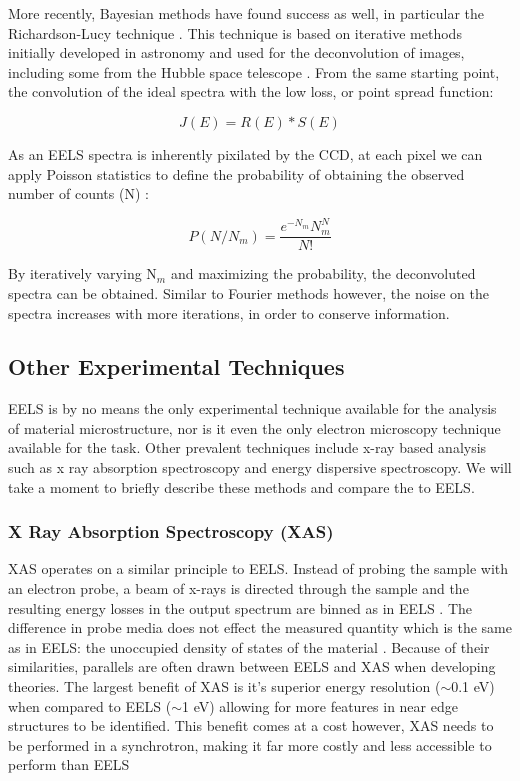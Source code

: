 More recently, Bayesian methods have found success as well, in particular the Richardson-Lucy technique \cite{richardson_lucy}. This technique is based on iterative methods initially developed in astronomy and used for the deconvolution of images, including some from the Hubble space telescope \cite{hubble}.  From the same starting point, the convolution of the ideal spectra with the low loss, or point spread function:

\begin{equation}
J(E) = R(E)\ast S(E)
\end{equation}

As an EELS spectra is inherently pixilated by the CCD, at each pixel we can apply Poisson statistics to define the probability of obtaining the observed number of counts (N) \cite{richardson_lucy}:  

\begin{equation}
	P (N/N_m) = \frac{e^{-N_m}N^N_m}{N!}
\end{equation}

By iteratively varying N$_m$ and maximizing the probability, the deconvoluted spectra can be obtained.  Similar to Fourier methods however, the noise on the spectra increases with more iterations, in order to conserve information.   


\subsection{Other Experimental Techniques}
EELS is by no means the only experimental technique available for the analysis of material microstructure, nor is it even the only electron microscopy technique available for the task. Other prevalent techniques include x-ray based analysis such as x ray absorption spectroscopy and energy dispersive spectroscopy.  We will take a moment to briefly describe these methods and compare the to EELS.

\subsubsection{X Ray Absorption Spectroscopy (XAS)}
XAS operates on a similar principle to EELS.  Instead of probing the sample with an electron probe, a beam of x-rays is directed through the sample and the resulting energy losses in the output spectrum are binned as in EELS \cite{groot_high-resolution_2001}.  The difference in probe media does not effect the measured quantity which is the same as in EELS: the unoccupied density of states of the material \cite{groot_high-resolution_2001}.  Because of their similarities, parallels are often drawn between EELS and XAS when developing theories.  The largest benefit of XAS is it's superior energy resolution ($\sim$0.1 eV) when compared to EELS ($\sim$1 eV) allowing for more features in near edge structures to be identified\cite{Egerton, groot_high-resolution_2001}.  This benefit comes at a cost however, XAS needs to be performed in a synchrotron, making it far more costly and less accessible to perform than EELS


